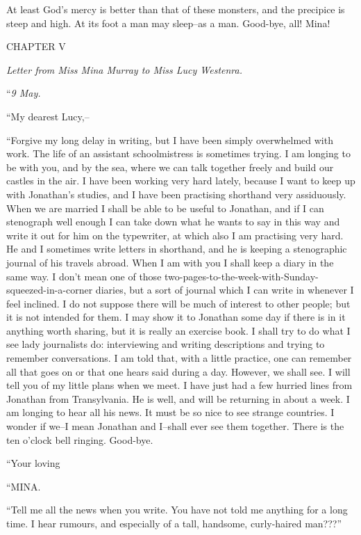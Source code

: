\documentclass[12pt,openright]{book}
\begin{document}
At least God’s mercy is better than that of these monsters, and the precipice is steep and high. At its foot a man may sleep–as a man. Good-bye, all! Mina!

CHAPTER V

\textit{Letter from Miss Mina Murray to Miss Lucy Westenra.}

“\textit{9 May.}

“My dearest Lucy,–

“Forgive my long delay in writing, but I have been simply overwhelmed with work. The life of an assistant schoolmistress is sometimes trying. I am longing to be with you, and by the sea, where we can talk together freely and build our castles in the air. I have been working very hard lately, because I want to keep up with Jonathan’s studies, and I have been practising shorthand very assiduously. When we are married I shall be able to be useful to Jonathan, and if I can stenograph well enough I can take down what he wants to say in this way and write it out for him on the typewriter, at which also I am practising very hard. He and I sometimes write letters in shorthand, and he is keeping a stenographic journal of his travels abroad. When I am with you I shall keep a diary in the same way. I don’t mean one of those two-pages-to-the-week-with-Sunday-squeezed-in-a-corner diaries, but a sort of journal which I can write in whenever I feel inclined. I do not suppose there will be much of interest to other people; but it is not intended for them. I may show it to Jonathan some day if there is in it anything worth sharing, but it is really an exercise book. I shall try to do what I see lady journalists do: interviewing and writing descriptions and trying to remember conversations. I am told that, with a little practice, one can remember all that goes on or that one hears said during a day. However, we shall see. I will tell you of my little plans when we meet. I have just had a few hurried lines from Jonathan from Transylvania. He is well, and will be returning in about a week. I am longing to hear all his news. It must be so nice to see strange countries. I wonder if we–I mean Jonathan and I–shall ever see them together. There is the ten o’clock bell ringing. Good-bye.

“Your loving

“MINA.

“Tell me all the news when you write. You have not told me anything for a long time. I hear rumours, and especially of a tall, handsome, curly-haired man???”
\end{document}
